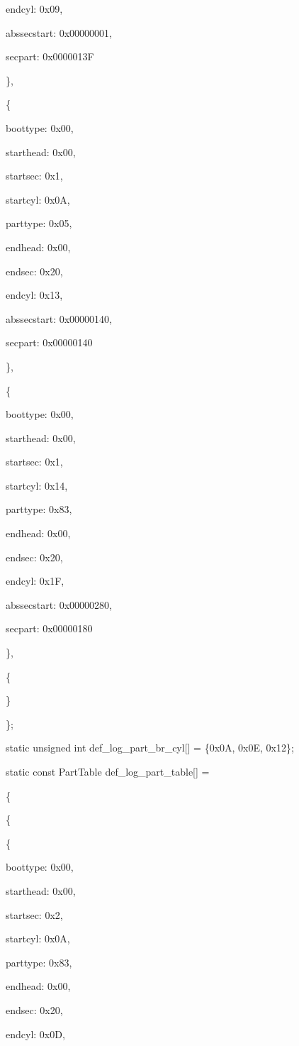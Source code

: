 \documentclass[11pt]{article}
\begin{document}
		endcyl: 0x09,
		
		abssecstart: 0x00000001,
		
		secpart: 0x0000013F
		
	\},
	
	\{
	
		boottype: 0x00,
		
		starthead: 0x00,
		
		startsec: 0x1,
		
		startcyl: 0x0A, 
		
		parttype: 0x05,
		
		endhead: 0x00,
		
		endsec: 0x20,
		
		endcyl: 0x13,
		
		abssecstart: 0x00000140,
		
		secpart: 0x00000140
		
	\},
	
	\{
	
		boottype: 0x00,
		
		starthead: 0x00,
		
		startsec: 0x1,
		
		startcyl: 0x14,
		
		parttype: 0x83,
		
		endhead: 0x00,
		
		endsec: 0x20,
		
		endcyl: 0x1F,
		
		abssecstart: 0x00000280,
		
		secpart: 0x00000180
		
	\},
	
	\{
	
	\}
	
\};

static unsigned int def\_log\_part\_br\_cyl[] = \{0x0A, 0x0E, 0x12\};

static const PartTable def\_log\_part\_table[] =

\{

	\{
	
		\{
		
			boottype: 0x00,
			
			starthead: 0x00,
			
			startsec: 0x2,
			
			startcyl: 0x0A,
			
			parttype: 0x83,
			
			endhead: 0x00,
			
			endsec: 0x20,
			
			endcyl: 0x0D,
			
\end{document}
